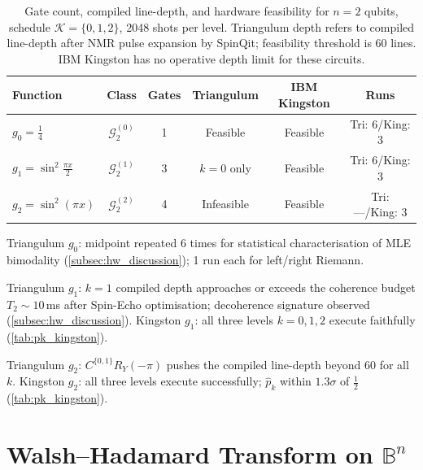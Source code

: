 \documentclass[12pt,a4paper]{article}
\theoremstyle{plain}
\theoremstyle{definition}
\theoremstyle{remark}
\newcommand{\Gclass}[2]{\mathcal{G}_{#1}^{(#2)}}
\begin{document}
\begin{table}[h]
\centering
\caption{Gate count, compiled line-depth, and hardware feasibility
  for $n=2$ qubits, schedule $\mathcal{K}=\{0,1,2\}$, 2048 shots
  per level.
  Triangulum depth refers to compiled line-depth after NMR pulse
  expansion by SpinQit; feasibility threshold is 60 lines.
  IBM Kingston has no operative depth limit for these circuits.}
\label{tab:depth_summary}
\begin{threeparttable}
\renewcommand{\arraystretch}{1.3}
\begin{tabular}{lccccc}
\toprule
Function & Class & Gates & Triangulum & IBM Kingston & Runs \\
\midrule
$g_0=\tfrac{1}{4}$
  & $\Gclass{2}{0}$ & 1
  & Feasible\tnote{a} & Feasible
  & Tri: 6\;/\;King: 3 \\
$g_1=\sin^2\!\tfrac{\pi x}{2}$
  & $\Gclass{2}{1}$ & 3
  & $k{=}0$ only\tnote{b} & Feasible
  & Tri: 6\;/\;King: 3 \\
$g_2=\sin^2(\pi x)$
  & $\Gclass{2}{2}$ & 4
  & Infeasible\tnote{c} & Feasible
  & Tri: ---\;/\;King: 3 \\
\bottomrule
\end{tabular}
\begin{tablenotes}
\footnotesize
\item[a] Triangulum $g_0$: midpoint repeated 6 times for statistical
  characterisation of MLE bimodality
  (\cref{subsec:hw_discussion}); 1 run each for left/right Riemann.
\item[b] Triangulum $g_1$: $k=1$ compiled depth approaches or
  exceeds the coherence budget $T_2\sim10$\,ms after Spin-Echo
  optimisation; decoherence signature observed
  (\cref{subsec:hw_discussion}).
  Kingston $g_1$: all three levels $k=0,1,2$ execute faithfully
  (\cref{tab:pk_kingston}).
\item[c] Triangulum $g_2$: $C^{\{0,1\}}R_Y(-\pi)$ pushes the
  compiled line-depth beyond 60 for all $k$.
  Kingston $g_2$: all three levels execute successfully;
  $\hat{p}_k$ within $1.3\sigma$ of $\tfrac{1}{2}$
  (\cref{tab:pk_kingston}).
\end{tablenotes}
\end{threeparttable}
\end{table}

\section{Walsh--Hadamard Transform on \texorpdfstring{$\mathbb{B}^n$}{B\^{}n}}
\label{app:walsh}
\end{document}
